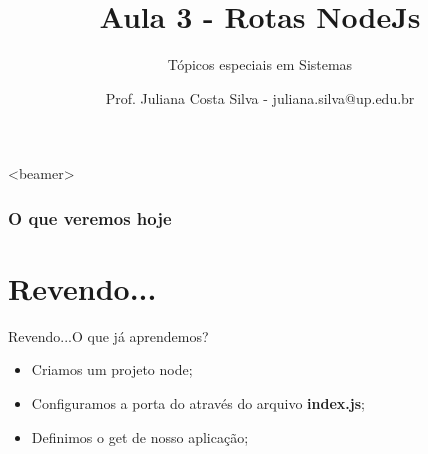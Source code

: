 \documentclass{beamer}
\title{Aula 3  - Rotas NodeJs}
\subtitle{Tópicos especiais em Sistemas}
\author{Prof. Juliana Costa Silva - juliana.silva@up.edu.br}
\begin{document}
  \frame[c]{\maketitle}
      \begin{frame}<beamer>
      \frametitle{O que veremos hoje}
      \tableofcontents
    \end{frame}
    \section{Revendo...}
    \begin{frame}{Revendo...}{O que já aprendemos?}
      
      \begin{itemize}
            \item Criamos um projeto node;
            \item Configuramos a porta do através do arquivo \textbf{index.js};
            \item Definimos o get de nosso aplicação;
       \end{itemize}
     \end{frame}
\end{document}
